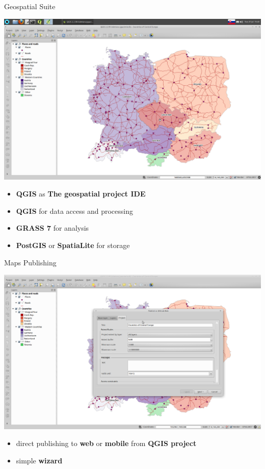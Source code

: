 \documentclass[12pt]{beamer}
\begin{document}
\begin{frame}{Geospatial Suite}
	\begin{center}
		\includegraphics[keepaspectratio=true,height=0.5\textheight]{images/gislab-desktop.png}
	\end{center}
	\begin{itemize}
		\item \textbf{QGIS} as \textbf{The geospatial project IDE}
		\item \textbf{QGIS} for data access and processing
		\item \textbf{GRASS 7} for analysis
		\item \textbf{PostGIS} or \textbf{SpatiaLite} for storage
	\end{itemize}
\end{frame}

\begin{frame}{Maps Publishing}
	\begin{center}
		\includegraphics[keepaspectratio=true,height=0.5\textheight]{images/gislab-publish.png}
	\end{center}
	\begin{itemize}
		\item direct publishing to \textbf{web} or \textbf{mobile} from \textbf{QGIS project}
		\item simple \textbf{wizard}
	\end{itemize}
\end{frame}
\end{document}
